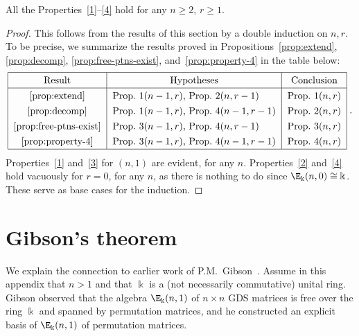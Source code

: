 \begin{theo}\label{thm:properties}
 All the Properties~\ref{1}--\ref{4} hold for any $n \ge 2$, $r\ge
 1$.
\end{theo}

\begin{proof}
This follows from the results of this section by a double induction on
$n,r$. To be precise, we summarize the results proved in Propositions~\ref{prop:extend}, \ref{prop:decomp}, \ref{prop:free-ptns-exist}, and~\ref{prop:property-4} in the table below:
\[
\renewcommand{\arraystretch}{1.3}
\begin{tabular}{|c|l|c|}
\hline
 Result & \multicolumn{1}{c|}{Hypotheses} & Conclusion \\ \hline
\ref{prop:extend}& Prop.~1$(n-1,r)$, Prop.~2$(n,r-1)$ & Prop.~1$(n,r)$ \\
\ref{prop:decomp}& Prop.~1$(n-1,r)$, Prop.~4$(n-1,r-1)$ & Prop.~2$(n,r)$ \\
\ref{prop:free-ptns-exist}& Prop.~3$(n-1,r)$, Prop.~4$(n,r-1)$ & Prop.~3$(n,r)$ \\
\ref{prop:property-4}& Prop.~3$(n-1,r)$, Prop.~4$(n-1,r-1)$ & Prop.~4$(n,r)$\\ \hline
\end{tabular}\; .
\]
Properties~\ref{1} and~\ref{3} for $(n,1)$ are evident, for any
$n$. Properties~\ref{2} and~\ref{4} hold vacuously for $r=0$, for any
$n$, as there is nothing to do since $\E_\Bbbk(n,0) \cong
\Bbbk$. These serve as base cases for the induction.
\end{proof}





\appendix
\section{Gibson's theorem}\label{sec:Gibson}%
We explain the connection to earlier work of P.M.~Gibson~\cite{Gibson}. Assume in this appendix that $n > 1$ and that $\Bbbk$
is a (not necessarily commutative) unital ring. Gibson observed that
the algebra $\E_\Bbbk(n,1)$ of $n \times n$ GDS matrices is free over
the ring $\Bbbk$ and spanned by permutation matrices, and he
constructed an explicit basis of $\E_\Bbbk(n,1)$ of permutation
matrices.

